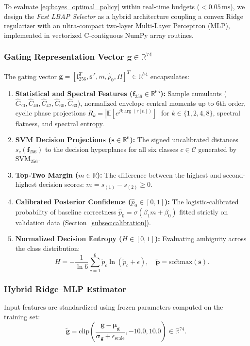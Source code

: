 To evaluate \eqref{eq:bayes_optimal_policy} within real-time budgets ($<0.05\,\mathrm{ms}$), we design the \emph{Fast LBAP Selector} as a hybrid architecture coupling a convex Ridge regularizer with an ultra-compact two-layer Multi-Layer Perceptron (MLP), implemented in vectorized C-contiguous NumPy array routines.

\subsubsection{Gating Representation Vector $\mathbf{g} \in \mathbb{R}^{74}$}
The gating vector $\mathbf{g} = [\mathbf{f}_{256}^T, \mathbf{s}^T, m, \hat{p}_0, H]^T \in \mathbb{R}^{74}$ encapsulates:
\begin{enumerate}
    \item \textbf{Statistical and Spectral Features ($\mathbf{f}_{256} \in \mathbb{R}^{65}$):} Sample cumulants ($\hat{C}_{20}, \hat{C}_{40}, \hat{C}_{42}, \hat{C}_{60}, \hat{C}_{63}$), normalized envelope central moments up to 6th order, cyclic phase projections $R_k = |\mathbb{E}[e^{j k \arg(r[n])}]|$ for $k \in \{1, 2, 4, 8\}$, spectral flatness, and spectral entropy.
    \item \textbf{SVM Decision Projections ($\mathbf{s} \in \mathbb{R}^6$):} The signed uncalibrated distances $s_c(\mathbf{f}_{256})$ to the decision hyperplanes for all six classes $c \in \mathcal{C}$ generated by $\mathrm{SVM}_{256}$.
    \item \textbf{Top-Two Margin ($m \in \mathbb{R}$):} The difference between the highest and second-highest decision scores: $m = s_{(1)} - s_{(2)} \ge 0$.
    \item \textbf{Calibrated Posterior Confidence ($\hat{p}_0 \in [0, 1]$):} The logistic-calibrated probability of baseline correctness $\hat{p}_0 = \sigma(\beta_1 m + \beta_0)$ fitted strictly on validation data (Section~\ref{subsec:calibration}).
    \item \textbf{Normalized Decision Entropy ($H \in [0, 1]$):} Evaluating ambiguity across the class distribution:
    \begin{equation}
        H = -\frac{1}{\ln 6} \sum_{c=1}^6 \tilde{p}_c \ln(\tilde{p}_c + \epsilon), \quad \tilde{\mathbf{p}} = \mathrm{softmax}(\mathbf{s}).
        \label{eq:decision_entropy}
    \end{equation}
\end{enumerate}

\subsubsection{Hybrid Ridge--MLP Estimator}
Input features are standardized using frozen parameters computed on the training set:
\begin{equation}
    \tilde{\mathbf{g}} = \mathrm{clip}\left( \frac{\mathbf{g} - \boldsymbol{\mu}_{\mathbf{g}}}{\boldsymbol{\sigma}_{\mathbf{g}} + \epsilon_{\mathrm{scale}}}, -10.0, 10.0 \right) \in \mathbb{R}^{74}.
    \label{eq:input_standardization}
\end{equation}

